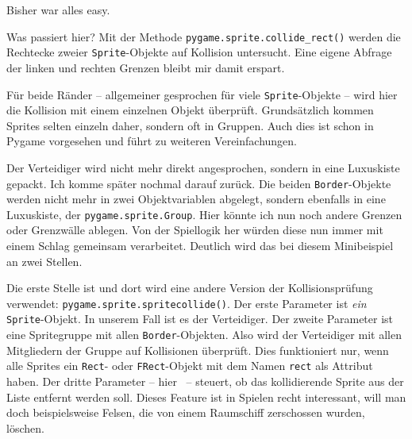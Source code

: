 Bisher war alles easy. 


Was passiert hier? Mit der Methode \texttt{pygame.sprite.collide\_rect()} werden die Rechtecke zweier \texttt{Sprite}-Objekte auf Kollision untersucht. Eine eigene Abfrage der linken und rechten Grenzen bleibt mir damit erspart.

Für beide Ränder -- allgemeiner gesprochen für viele \texttt{Sprite}-Objekte -- wird hier die Kollision mit einem einzelnen Objekt überprüft. Grundsätzlich kommen Sprites selten einzeln daher, sondern oft in Gruppen. Auch dies ist schon in Pygame vorgesehen und führt zu weiteren Vereinfachungen.

\newpage
{}

Der Verteidiger wird nicht mehr direkt angesprochen, sondern in eine Luxuskiste gepackt. Ich komme später nochmal darauf zurück. Die beiden \texttt{Border}-Objekte werden nicht mehr in zwei Objektvariablen abgelegt, sondern ebenfalls in eine Luxuskiste, der \texttt{pygame.sprite.Group}. Hier könnte ich nun noch andere Grenzen oder Grenzwälle ablegen. Von der Spiellogik her würden diese nun immer mit einem Schlag gemeinsam verarbeitet. Deutlich wird das bei diesem Minibeispiel an zwei Stellen.

Die erste Stelle ist  und dort wird eine andere Version der Kollisionsprüfung verwendet: \texttt{pygame.sprite.\-sprite\-collide()}. Der erste Parameter ist \emph{ein} \texttt{Sprite}-Objekt. In unserem Fall ist es der Verteidiger. Der zweite Parameter ist eine Spritegruppe mit allen \texttt{Border}-Objekten. Also wird der Verteidiger mit allen Mitgliedern der Gruppe auf Kollisionen überprüft. Dies funktioniert nur, wenn alle Sprites ein \texttt{Rect}- oder \texttt{FRect}-Objekt mit dem Namen \texttt{rect} als Attribut haben. Der dritte Parameter -- hier \false\ -- steuert, ob das kollidierende Sprite aus der Liste entfernt werden soll. Dieses Feature ist in Spielen recht interessant, will man doch beispielsweise Felsen, die von einem Raumschiff zerschossen wurden, löschen.

